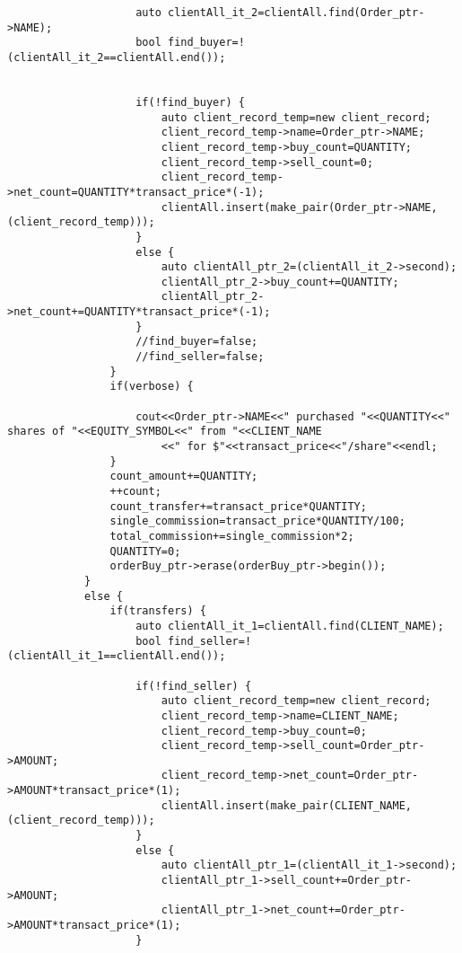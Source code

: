 \documentclass{article}
\begin{document}
\begin{spacing}{1.5}
\begin{lstlisting}
                    auto clientAll_it_2=clientAll.find(Order_ptr->NAME);
                    bool find_buyer=!(clientAll_it_2==clientAll.end());


                    if(!find_buyer) {
                        auto client_record_temp=new client_record;
                        client_record_temp->name=Order_ptr->NAME;
                        client_record_temp->buy_count=QUANTITY;
                        client_record_temp->sell_count=0;
                        client_record_temp->net_count=QUANTITY*transact_price*(-1);
                        clientAll.insert(make_pair(Order_ptr->NAME, (client_record_temp)));
                    }
                    else {
                        auto clientAll_ptr_2=(clientAll_it_2->second);
                        clientAll_ptr_2->buy_count+=QUANTITY;
                        clientAll_ptr_2->net_count+=QUANTITY*transact_price*(-1);
                    }
                    //find_buyer=false;
                    //find_seller=false;
                }
                if(verbose) {

                    cout<<Order_ptr->NAME<<" purchased "<<QUANTITY<<" shares of "<<EQUITY_SYMBOL<<" from "<<CLIENT_NAME
                        <<" for $"<<transact_price<<"/share"<<endl;
                }
                count_amount+=QUANTITY;
                ++count;
                count_transfer+=transact_price*QUANTITY;
                single_commission=transact_price*QUANTITY/100;
                total_commission+=single_commission*2;
                QUANTITY=0;
                orderBuy_ptr->erase(orderBuy_ptr->begin());
            }
            else {
                if(transfers) {
                    auto clientAll_it_1=clientAll.find(CLIENT_NAME);
                    bool find_seller=!(clientAll_it_1==clientAll.end());

                    if(!find_seller) {
                        auto client_record_temp=new client_record;
                        client_record_temp->name=CLIENT_NAME;
                        client_record_temp->buy_count=0;
                        client_record_temp->sell_count=Order_ptr->AMOUNT;
                        client_record_temp->net_count=Order_ptr->AMOUNT*transact_price*(1);
                        clientAll.insert(make_pair(CLIENT_NAME, (client_record_temp)));
                    }
                    else {
                        auto clientAll_ptr_1=(clientAll_it_1->second);
                        clientAll_ptr_1->sell_count+=Order_ptr->AMOUNT;
                        clientAll_ptr_1->net_count+=Order_ptr->AMOUNT*transact_price*(1);
                    }


\end{lstlisting}
\end{spacing}
\end{document}
